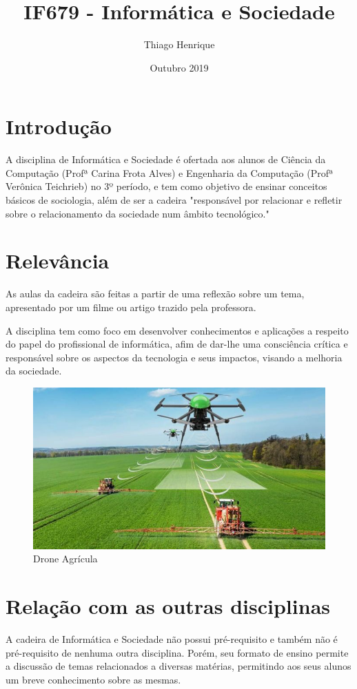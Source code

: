 \documentclass[a4 paper, 10pt]{article}
\title{IF679 - Informática e Sociedade}
\author{Thiago Henrique}
\date{Outubro 2019}
\begin{document}
\maketitle

\section{Introdução}

\quad A disciplina de Informática e Sociedade é ofertada aos alunos de Ciência da Computação (Profª Carina Frota Alves) e Engenharia da Computação (Profª Verônica Teichrieb) no 3º período, e tem como objetivo de ensinar conceitos básicos de sociologia, além de ser a cadeira "responsável por relacionar e refletir sobre o relacionamento da sociedade num âmbito tecnológico." \cite{sitepet}

\section{Relevância}

\quad As aulas da cadeira são feitas a partir de uma reflexão sobre um tema, apresentado por um filme ou artigo trazido pela professora.  \par
A disciplina tem como foco em desenvolver conhecimentos e aplicações a respeito do papel do profissional de informática, afim de dar-lhe uma consciência crítica e responsável sobre os aspectos  da tecnologia e seus impactos, visando a melhoria da sociedade.

\begin{figure}[h!]
\centering
\includegraphics[scale=0.4]{drone-agricola.jpg}
\caption{Drone Agrícula \cite{drone}}
\label{fig:drone-agricola.jpg}
\end{figure}

\section{Relação com as outras disciplinas}
\quad A cadeira de Informática e Sociedade não possui pré-requisito e também não é pré-requisito de nenhuma outra disciplina.\cite{perfil} Porém, seu formato de ensino permite a discussão de temas relacionados a diversas matérias, permitindo aos seus alunos um breve conhecimento sobre as mesmas.



\end{document}
